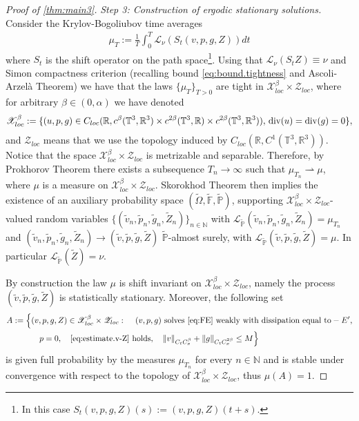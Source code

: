 \documentclass[10pt,a4paper]{amsart}
\numberwithin{equation}{section}
\numberwithin{corollario}{section}
\numberwithin{lemma}{section}
\numberwithin{prop}{section}
\theoremstyle{definition}
\theoremstyle{remark}
\newcommand{\N}{\mathbb{N}}
\newcommand{\R}{\mathbb{R}}
\newcommand{\T}{\mathbb{T}}
\newcommand{\dvg}{\mathord{{\rm div}}}
\begin{document}
\begin{proof}[Proof of \autoref{thm:main3}]
\textit{Step 3: Construction of ergodic stationary solutions.}
Consider the Krylov-Bogoliubov time averages
\begin{align}
  \mu_T :=  \frac{1}{T} \int_0^T \mathscr{L}_\nu(S_t(v,p,g,Z))dt
\end{align}
where $S_t$ is the shift operator on the path space\footnote{In this case $S_t(v,p,g,Z)(s) := (v,p,g,Z)(t+s)$.}.
Using that $\mathscr{L}_{\nu}(S_t Z) \equiv \nu$ and Simon compactness criterion \cite[Corollary 5]{Si86} (recalling bound \eqref{eq:bound.tightness} and Ascoli-Arzelà Theorem) we have that the laws $\{\mu_T\}_{T >0}$ are tight in $\mathscr{X}^\beta_{loc} \times \mathscr{Z}_{loc}$, where for arbitrary $\beta \in(0,\alpha)$ we have denoted
\begin{align}
    \mathscr{X}^\beta_{loc} :=
    \{ (u,p,g) \in C_{loc}(\R, c^\beta(\T^3,\R^3) \times  c^{2\beta}(\T^3,\R) \times  c^{2\beta}(\T^3,\R^3)), \, \dvg(u)=\dvg(g)=0\},
\end{align}
and $\mathscr{Z}_{loc}$ means that we use the topology induced by $C_{loc}(\R,C^1(\T^3,\R^3))$.
Notice that the space $\mathscr{X}^\beta_{loc} \times \mathscr{Z}_{loc}$ is metrizable and separable. Therefore, by Prokhorov Theorem there exists a subsequence $T_n \to \infty$ such that $\mu_{T_n} \rightharpoonup \mu$, where $\mu$ is a measure on $\mathscr{X}^\beta_{loc} \times \mathscr{Z}_{loc}$. 
Skorokhod Theorem then implies the existence of an auxiliary probability space $(\tilde{\Omega},\tilde{\mathbb{F}},\tilde{\mathbb{P}})$, supporting $\mathscr{X}^\beta_{loc} \times \mathscr{Z}_{loc}$-valued random variables $\{(\tilde{v}_n,\tilde{p}_n,\tilde{g}_n,\tilde{Z}_n)\}_{n \in \N}$ with $\mathscr{L}_{\tilde{\mathbb{P}}}(\tilde{v}_n,\tilde{p}_n,\tilde{g}_n,\tilde{Z}_n) = \mu_{T_n}$ and $(\tilde{v}_n,\tilde{p}_n,\tilde{g}_n,\tilde{Z}_n) \to (\tilde{v},\tilde{p},\tilde{g},\tilde{Z})$ $\tilde{\mathbb{P}}$-almost surely, with $\mathscr{L}_{\tilde{\mathbb{P}}}(\tilde{v},\tilde{p},\tilde{g},\tilde{Z})=\mu$. 
In particular $\mathscr{L}_{\tilde{\mathbb{P}}}(\tilde{Z}) = \nu$.

By construction the law $\mu$ is shift invariant on $\mathscr{X}^\beta_{loc} \times \mathscr{Z}_{loc}$, namely the process $(\tilde{v},\tilde{p},\tilde{g},\tilde{Z})$ is statistically stationary.
Moreover, the following set
\begin{align}
A := \Big\{ &(v,p,g,Z) \in \mathscr{X}^\beta_{loc} \times \mathscr{Z}_{loc} :\quad \,(v,p,g) \mbox{ solves \eqref{eq:FE} weakly with dissipation equal to}-E',
\\
&\quad {p}=0, \quad  \eqref{eq:estimate.v-Z} \mbox{ holds},
\quad\|v\|_{C_tC^\beta_x} 
+ 
\|g\|_{C_tC^{2\beta}_x} 
\leq 
M 
 \Big\}
\end{align}
is given full probability by the measures $\mu_{T_n}$ for every $n \in \N$ and is stable under convergence with respect to the topology of $\mathscr{X}^\beta_{loc} \times \mathscr{Z}_{loc}$, thus $\mu(A) = 1$.


\end{proof}
\end{document}
